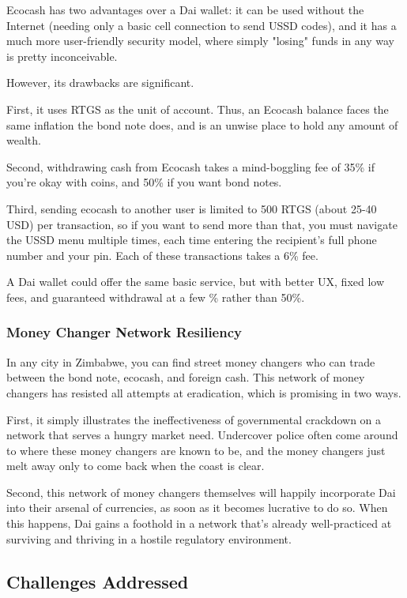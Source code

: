 \documentclass{article}
\begin{document}
Ecocash has two advantages over a Dai wallet: it can be used without the Internet (needing only a basic cell connection to send USSD codes), and it has a much more user-friendly security model, where simply "losing" funds in any way is pretty inconceivable.

However, its drawbacks are significant.

First, it uses RTGS as the unit of account. Thus, an Ecocash balance faces the same inflation the bond note does, and is an unwise place to hold any amount of wealth.

Second, withdrawing cash from Ecocash takes a mind-boggling fee of 35\% if you're okay with coins, and 50\% if you want bond notes.

Third, sending ecocash to another user is limited to 500 RTGS (about 25-40 USD) per transaction, so if you want to send more than that, you must navigate the USSD menu multiple times, each time entering the recipient's full phone number and your pin. Each of these transactions takes a 6\% fee.

A Dai wallet could offer the same basic service, but with better UX, fixed low fees, and guaranteed withdrawal at a few \% rather than 50\%.

\subsubsection{Money Changer Network Resiliency} \label{resilient money changers}

In any city in Zimbabwe, you can find street money changers who can trade between the bond note, ecocash, and foreign cash. This network of money changers has resisted all attempts at eradication, which is promising in two ways.

First, it simply illustrates the ineffectiveness of governmental crackdown on a network that serves a hungry market need. Undercover police often come around to where these money changers are known to be, and the money changers just melt away only to come back when the coast is clear. 

Second, this network of money changers themselves will happily incorporate Dai into their arsenal of currencies, as soon as it becomes lucrative to do so. When this happens, Dai gains a foothold in a network that's already well-practiced at surviving and thriving in a hostile regulatory
environment.

\subsection{Challenges Addressed} \label{challenges addressed}
\end{document}
